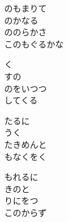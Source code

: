 \documentclass[10pt,b5j]{tarticle} %
\begin{document}
\begin{enumerate}
\begin{minipage}[c]{\blocksize}
        \vspace{\linespace}
        \item
        のもまりて\\
        のかなる\\
        ののらかさ\\
        このもぐるかな
        
        \vspace{\linespace}
        \item
        く\\
        すの\\
        のをいつつ\\
        してくる
        
        \vspace{\linespace}
        \item
        たるに\\
        うく\\
        たきめんと\\
        もなくをく
        
        \vspace{\linespace}
        \item
        もれるに\\
        きのと\\
        りにをつ\\
        このからず
    
    \end{minipage}
\end{enumerate} %
\end{document}

